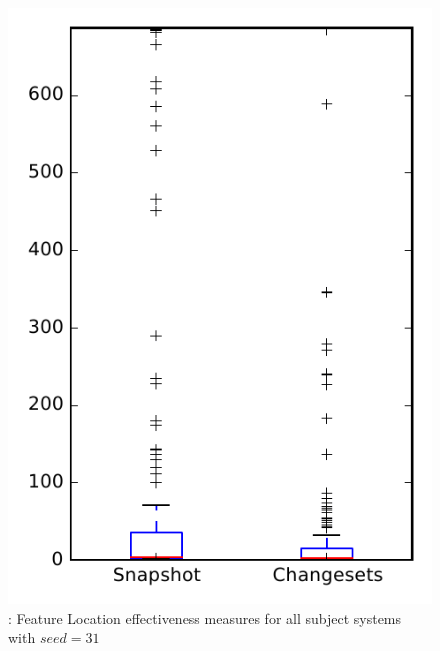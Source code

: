 
\begin{figure}
\centering
\includegraphics[height=0.4\textheight]{figures/flt_seed/rq1_overview_31}
\caption{\rone: Feature Location effectiveness measures for all subject systems with $seed=31$}
\label{fig:flt_seed:rq1:overview}
\end{figure}
